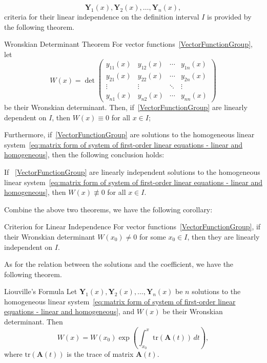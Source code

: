 \documentclass[11pt]{../../TexTemplate/elegantbook}
\begin{document}
\begin{equation}\label{VectorFunctionGroup}
    \mathbf{Y}_{1}(x), \mathbf{Y}_{2}(x), \ldots, \mathbf{Y}_{n}(x),
\end{equation}
criteria for their linear independence on the definition interval \(I\) is provided by the following theorem.
\begin{theorem}{Wronskian Determinant Theorem}
    For vector functions~\eqref{VectorFunctionGroup},
    let
    \[
    W(x) = \det
    \begin{pmatrix}
        y_{11}(x) & y_{12}(x) & \cdots & y_{1n}(x) \\
        y_{21}(x) & y_{22}(x) & \cdots & y_{2n}(x) \\
        \vdots & \vdots & \ddots & \vdots \\
        y_{n1}(x) & y_{n2}(x) & \cdots & y_{nn}(x)
    \end{pmatrix}
    \]
    be their Wronskian determinant.
    Then, if~\eqref{VectorFunctionGroup} are linearly dependent on \(I\), then \(W(x) \equiv 0\) for all \(x \in I\);
\end{theorem}
Furthermore, if~\eqref{VectorFunctionGroup} are solutions to 
the homogeneous linear system~\eqref{eq:matrix form of system of first-order linear equations - linear and homogeneous},
then the following conclusion holds:
\begin{theorem}
    If ~\eqref{VectorFunctionGroup} are linearly independent solutions to 
    the homogeneous linear system~\eqref{eq:matrix form of system of first-order linear equations - linear and homogeneous},
    then \(W(x) \not\equiv 0\) for all \(x \in I\).
\end{theorem}
Combine the above two theorems, we have the following corollary:
\begin{corollary}{Criterion for Linear Independence}\label{corollary:criterion for linear independence}
    For vector functions~\eqref{VectorFunctionGroup},
    if their Wronskian determinant \(W(x_{0}) \neq  0\) for some \(x_{0} \in I\),
    then they are linearly independent on \(I\).
\end{corollary}


As for the relation between the solutions and the coefficient,
we have the following theorem.
\begin{theorem}{Liouville's Formula}
    Let \(\mathbf{Y}_{1}(x), \mathbf{Y}_{2}(x), \ldots, \mathbf{Y}_{n}(x)\) be \(n\) solutions to 
    the homogeneous linear system~\eqref{eq:matrix form of system of first-order linear equations - linear and homogeneous},
    and \(W(x)\) be their Wronskian determinant.
    Then
    \[
    W(x) = W(x_{0}) \exp\left(\int_{x_{0}}^{x} \mathrm{tr}(\mathbf{A}(t)) \, dt\right),
    \]
    where \(\mathrm{tr}(\mathbf{A}(t))\) is the trace of matrix \(\mathbf{A}(t)\).
\end{theorem}
\end{document}
